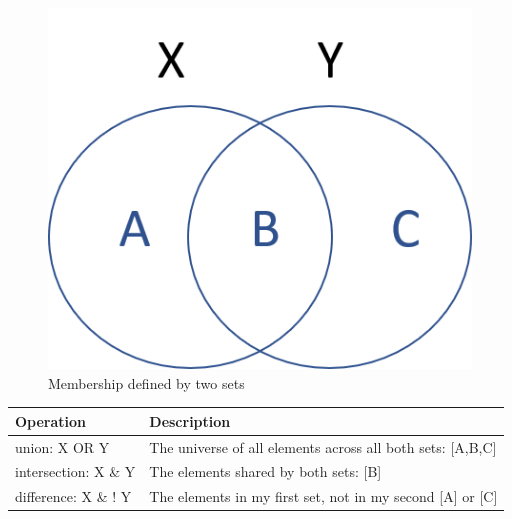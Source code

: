 \documentclass[]{book}
\theoremstyle{definition}
\theoremstyle{definition}
\theoremstyle{definition}
\theoremstyle{remark}
\begin{document}
\begin{figure}

{\centering \includegraphics[width=0.6\linewidth]{figures/xy} 

}

\caption{Membership defined by two sets}\label{fig:unnamed-chunk-121}
\end{figure}

\begin{longtable}[]{@{}ll@{}}
\toprule
\begin{minipage}[b]{0.53\columnwidth}\raggedright
Operation\strut
\end{minipage} & \begin{minipage}[b]{0.41\columnwidth}\raggedright
Description\strut
\end{minipage}\tabularnewline
\midrule
\endhead
\begin{minipage}[t]{0.53\columnwidth}\raggedright
union: X OR Y\strut
\end{minipage} & \begin{minipage}[t]{0.41\columnwidth}\raggedright
The universe of all elements across all both sets: {[}A,B,C{]}\strut
\end{minipage}\tabularnewline
\begin{minipage}[t]{0.53\columnwidth}\raggedright
intersection: X \& Y\strut
\end{minipage} & \begin{minipage}[t]{0.41\columnwidth}\raggedright
The elements shared by both sets: {[}B{]}\strut
\end{minipage}\tabularnewline
\begin{minipage}[t]{0.53\columnwidth}\raggedright
difference: X \& ! Y\strut
\end{minipage} & \begin{minipage}[t]{0.41\columnwidth}\raggedright
The elements in my first set, not in my second {[}A{]} or {[}C{]}\strut
\end{minipage}\tabularnewline
\bottomrule
\end{longtable}
\end{document}
